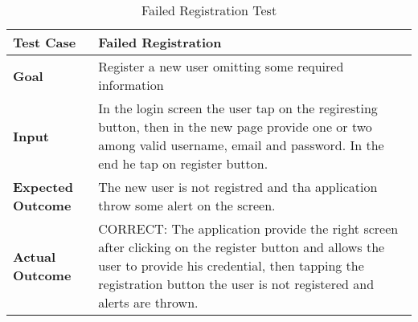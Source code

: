 \begin{table}[H]
	\centering
	\begin{tabular}{ll}
	\hline
	\textbf{Test Case}& Failed Registration\\
	\hline
	\textbf{Goal}& Register a new user omitting some required information\\
	\hline
	\textbf{Input}& In the login screen the user tap on the regiresting button, then in the new page provide one or two among valid username, email and password. In the end he tap on register button.\\
	\hline
	\textbf{Expected Outcome}& The new user is not registred and tha application throw some alert on the screen.\\
	\hline
	\textbf{Actual Outcome}& CORRECT: The application provide the right screen after clicking on the register button and allows the user to provide his credential, then tapping the registration button the user is not registered and alerts are thrown.\\
	\hline	
	\end{tabular}
	\caption{Failed Registration Test}
\end{table}
